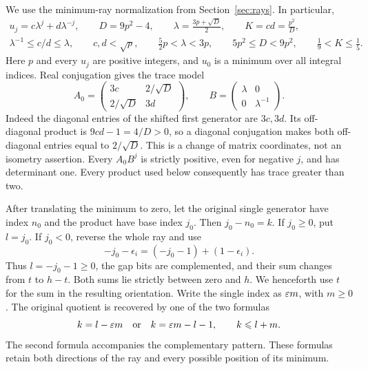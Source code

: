 We use the minimum-ray normalization from Section~\ref{sec:rays}.
In particular,
\begin{equation}\label{eq:gap-ray-data}
 \begin{gathered}
 u_j=c\lambda^j+d\lambda^{-j},\qquad
 D=9p^2-4,\qquad \lambda=\frac{3p+\sqrt D}{2},\qquad
 K=cd=\frac{p^2}{D},\\
 \lambda^{-1}\leqslant c/d\leqslant\lambda,\qquad
 c,d<\sqrt p,\qquad
 \frac52p<\lambda<3p,\qquad
 5p^2\leqslant D<9p^2,\qquad \frac19<K\leqslant\frac15.
 \end{gathered}
\end{equation}
Here $p$ and every $u_j$ are positive integers, and $u_0$ is a minimum
over all integral indices. Real conjugation gives the trace model
\begin{equation}\label{eq:gap-positive-model}
 A_0=\begin{pmatrix}3c&2/\sqrt D\\2/\sqrt D&3d\end{pmatrix},
 \qquad B=\begin{pmatrix}\lambda&0\\0&\lambda^{-1}\end{pmatrix}.
\end{equation}
Indeed the diagonal entries of the shifted first generator are $3c,3d$.
Its off-diagonal product is $9cd-1=4/D>0$, so a diagonal conjugation
makes both off-diagonal entries equal to $2/\sqrt D$. This is a change
of matrix coordinates, not an isometry assertion. Every $A_0B^j$ is
strictly positive, even for negative $j$, and has determinant one.
Every product used below consequently has trace greater than two.

After translating the minimum to zero, let the original single generator
have index $n_0$ and the product have base index $j_0$. Then
$j_0-n_0=k$. If $j_0\geqslant0$, put $l=j_0$. If $j_0<0$, reverse
the whole ray and use
\begin{equation}\label{eq:gap-complement}
 -j_0-\epsilon_i=(-j_0-1)+(1-\epsilon_i).
\end{equation}
Thus $l=-j_0-1\geqslant0$, the gap bits are complemented, and their
sum changes from $t$ to $h-t$. Both sums lie strictly between zero and
$h$. We henceforth use $t$ for the sum in the resulting orientation.
Write the single index as $\varepsilon m$, with $m\geqslant0$. The original
quotient is recovered by one of the two formulas
\begin{equation}\label{eq:gap-reconstruction}
 k=l-\varepsilon m
 \quad\hbox{or}\quad k=\varepsilon m-l-1,
 \qquad k\leqslant l+m.
\end{equation}
The second formula accompanies the complementary pattern. These
formulas retain both directions of the ray and every possible position
of its minimum.

